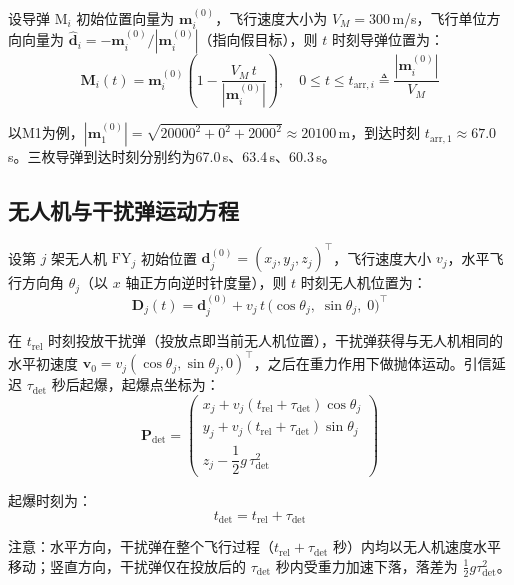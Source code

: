 \documentclass[12pt, a4paper]{article}
\begin{document}
设导弹 $\mathrm{M}_i$ 初始位置向量为 $\boldsymbol{m}_i^{(0)}$，飞行速度大小为 $V_M=300$\,m/s，飞行单位方向向量为 $\hat{\boldsymbol{d}}_i = -\boldsymbol{m}_i^{(0)}/|\boldsymbol{m}_i^{(0)}|$（指向假目标），则 $t$ 时刻导弹位置为：
\begin{equation}
\boldsymbol{M}_i(t) = \boldsymbol{m}_i^{(0)}\left(1 - \frac{V_M\,t}{|\boldsymbol{m}_i^{(0)}|}\right), \quad 0 \le t \le t_{\mathrm{arr},i} \triangleq \frac{|\boldsymbol{m}_i^{(0)}|}{V_M}
\label{eq:missile}
\end{equation}

以M1为例，$|\boldsymbol{m}_1^{(0)}| = \sqrt{20000^2+0^2+2000^2} \approx 20100$\,m，到达时刻 $t_{\mathrm{arr},1} \approx 67.0$\,s。三枚导弹到达时刻分别约为67.0\,s、63.4\,s、60.3\,s。

\subsection{无人机与干扰弹运动方程}

设第 $j$ 架无人机 $\mathrm{FY}_j$ 初始位置 $\boldsymbol{d}_j^{(0)}=(x_j,y_j,z_j)^{\top}$，飞行速度大小 $v_j$，水平飞行方向角 $\theta_j$（以 $x$ 轴正方向逆时针度量），则 $t$ 时刻无人机位置为：
\begin{equation}
\boldsymbol{D}_j(t) = \boldsymbol{d}_j^{(0)} + v_j\,t\,\big(\cos\theta_j,\;\sin\theta_j,\;0\big)^{\top}
\label{eq:drone}
\end{equation}

在 $t_{\mathrm{rel}}$ 时刻投放干扰弹（投放点即当前无人机位置），干扰弹获得与无人机相同的水平初速度 $\boldsymbol{v}_0 = v_j(\cos\theta_j,\sin\theta_j,0)^{\top}$，之后在重力作用下做抛体运动。引信延迟 $\tau_{\mathrm{det}}$ 秒后起爆，起爆点坐标为：
\begin{equation}
\boldsymbol{P}_{\mathrm{det}} = \begin{pmatrix}
x_j + v_j(t_{\mathrm{rel}}+\tau_{\mathrm{det}})\cos\theta_j \\
y_j + v_j(t_{\mathrm{rel}}+\tau_{\mathrm{det}})\sin\theta_j \\
z_j - \dfrac{1}{2}g\,\tau_{\mathrm{det}}^2
\end{pmatrix}
\label{eq:detpos}
\end{equation}

起爆时刻为：
\begin{equation}
t_{\mathrm{det}} = t_{\mathrm{rel}} + \tau_{\mathrm{det}}
\end{equation}

注意：水平方向，干扰弹在整个飞行过程（$t_{\mathrm{rel}}+\tau_{\mathrm{det}}$ 秒）内均以无人机速度水平移动；竖直方向，干扰弹仅在投放后的 $\tau_{\mathrm{det}}$ 秒内受重力加速下落，落差为 $\frac{1}{2}g\tau_{\mathrm{det}}^2$。
\end{document}
